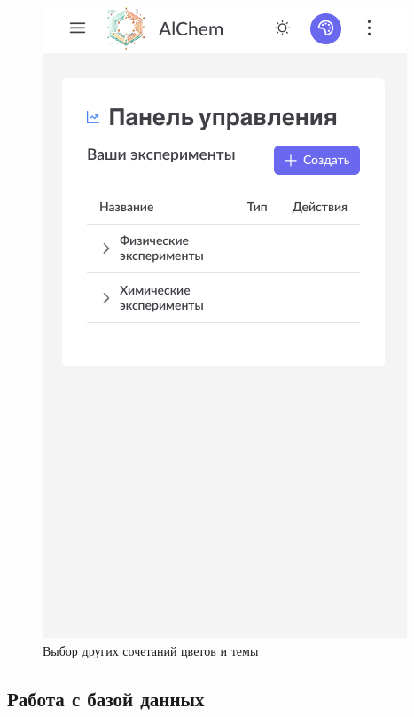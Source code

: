 \begin{figure}[H]
\begin{minipage}{0.45\linewidth}
        \includegraphics[width=\linewidth]{img/other_colors.png}
        \caption{Выбор других сочетаний цветов и темы}
        \label{pic:other_colors}
    \end{minipage}
\end{figure}
\vspace{0.5cm}

\subsection{Работа с базой данных}

